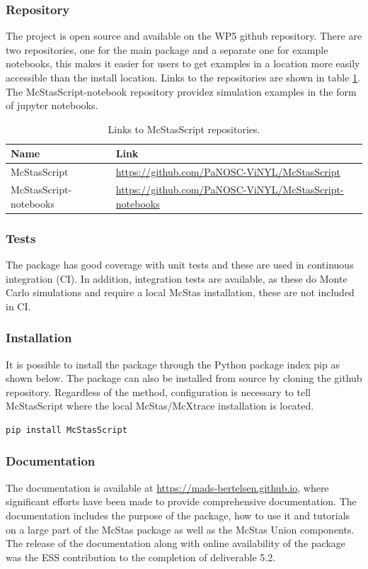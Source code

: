 \documentclass[11pt, a4paper]{article}
\begin{document}
\subsubsection{Repository}
The project is open source and available on the WP5 github repository. There are
two repositories, one for the main package and a separate one for example
notebooks, this makes it easier for users to get examples in a location more
easily accessible than the install location. Links to the repositories are shown
in table \ref{tab:links}. The McStasScript-notebook repository providez
simulation examples in the form of jupyter notebooks.

\begin{table}[h!!!]
\centering
\begin{tabular}{l|l}
Name & Link \\\hline
McStasScript & \href{https://github.com/PaNOSC-ViNYL/McStasScript}{https://github.com/PaNOSC-ViNYL/McStasScript} \\
McStasScript-notebooks &  \href{https://github.com/PaNOSC-ViNYL/McStasScript-notebooks}{https://github.com/PaNOSC-ViNYL/McStasScript-notebooks}
\end{tabular}
\caption{\label{tab:links} Links to McStasScript repositories.}
\end{table}

\subsubsection{Tests}
The package has good coverage with unit tests and these are used in continuous integration (CI). In addition, integration tests are available, as these do Monte Carlo simulations and require a local McStas installation, these are not included in CI.

\subsubsection{Installation}
It is possible to install the package through the Python package index pip as shown below. The package can also be installed from source by cloning the github repository. Regardless of the method, configuration is necessary to tell McStasScript where the local McStas/McXtrace installation is located.

\begin{lstlisting}[language=Python]
pip install McStasScript
\end{lstlisting}

\subsubsection{Documentation}
The documentation is available at \href{https://mads-bertelsen.github.io}{https://mads-bertelsen.github.io}, where significant efforts have been made to provide comprehensive documentation. The documentation includes the purpose of the package, how to use it and tutorials on a large part of the McStas package as well as the McStas Union components. The release of the documentation along with online availability of the package was the ESS contribution to the completion of deliverable 5.2.
\end{document}

